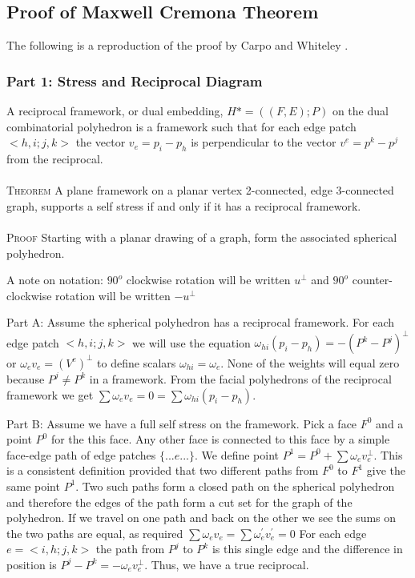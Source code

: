 \documentclass[11pt]{article}
\begin{document}
\subsection{Proof of Maxwell Cremona Theorem}
The following is a reproduction of the proof by Carpo and Whiteley \cite{mccProof}.
\subsubsection{Part 1: Stress and Reciprocal Diagram}
A reciprocal framework, or dual embedding, $H* = ((F,E);P)$ on the dual combinatorial polyhedron is a framework such that for each edge patch $<h,i;j,k>$  the vector $v_e = p_i - p_h$ is perpendicular to the vector $v^e = p^k - p^j$ from the reciprocal. \\
\\
\textsc{Theorem} A plane framework on a planar vertex 2-connected, edge 3-connected graph, supports a self stress if and only if it has a reciprocal framework. \\
\\
\textsc{Proof} Starting with a planar drawing of a graph, form the associated spherical polyhedron. 

A note on notation: $90^o$ clockwise rotation will be written $u^\bot$ and $90^o$ counter-clockwise rotation will be written $-u^\bot$

Part A: Assume the spherical polyhedron has a reciprocal framework.
For each edge patch $<h,i;j,k>$ we will use the equation $\omega_{hi}(p_i - p_h) = -(P^k - P^j)^\bot$ or $\omega_ev_e = (V^e)^\bot$ to define scalars $\omega_{hi} = \omega_e$. None of the weights will equal zero because $P^j \neq P^k$ in a framework. From the facial polyhedrons of the reciprocal framework we get $\sum\omega_ev_e = 0 = \sum\omega_{hi}(p_i - p_h)$.

Part B: Assume we have a full self stress on the framework.
Pick a face $F^0$ and a point $P^0$ for the this face. Any other face is connected to this face by a simple face-edge path of edge patches $\{...e...\}$. We define point $P^1 = P^0 + \sum\omega_ev_e^\bot$. This is a consistent definition provided that two different paths from $F^0$ to $F^1$ give the same point $P^1$. Two such paths form a closed path on the spherical polyhedron and therefore the edges of the path form a cut set for the graph of the polyhedron. If we travel on one path and back on the other we see the sums on the two paths are equal, as required $\sum\omega_ev_e = \sum\omega_e^{'}v_e^{'} = 0$ For each edge $e = <i,h;j,k>$ the path from $P^j$ to $P^k$ is this single edge and the difference in position is $P^j - P^k = -\omega_ev_e^\bot$. Thus, we have a true reciprocal.
\end{document}
